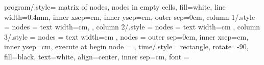 \documentclass{article}
\begin{document}
\sloppy
\pagestyle{empty}
\setlength{\parindent}{0cm} %

\small
\tikzset
{
    program/.style=
    {
        matrix of nodes,
        nodes in empty cells,
        fill=white,
        line width=0.4mm,
        inner xsep=cm,
        inner ysep=cm,
        outer sep=0cm,
        column 1/.style =
        {
            nodes =
            {
                text width=cm,
            }
        },
        column 2/.style =
        {
            nodes =
            {
                text width=cm
            }
        },
        column 3/.style =
        {
            nodes =
            {
                text width=cm
            }
        },
        nodes =
        {
            outer sep=0cm,
            inner xsep=cm,
            inner ysep=cm,
            execute at begin node = 
        }
    },
    time/.style=
    {
        rectangle,
        rotate=-90,
        fill=black,
        text=white,
        align=center,
        inner sep=cm,
        font = \Large
    }
}

\end{document}
